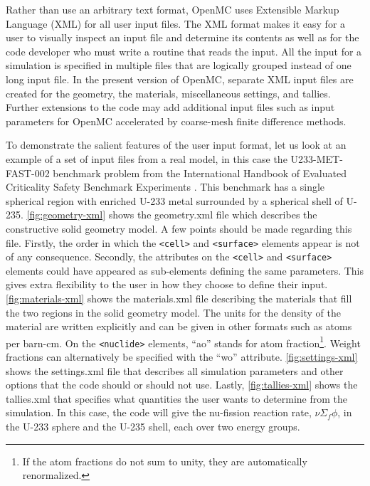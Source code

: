 \documentclass[authoryear,preprint]{elsarticle}
\begin{document}
Rather than use an arbitrary text format, OpenMC uses Extensible Markup Language
(XML) for all user input files. The XML format makes it easy for a user to
visually inspect an input file and determine its contents as well as for the
code developer who must write a routine that reads the input. All the input for
a simulation is specified in multiple files that are logically grouped instead
of one long input file. In the present version of OpenMC, separate XML input
files are created for the geometry, the materials, miscellaneous settings, and
tallies. Further extensions to the code may add additional input files such as
input parameters for OpenMC accelerated by coarse-mesh finite difference
methods.

To demonstrate the salient features of the user input format, let us look at an
example of a set of input files from a real model, in this case the
U233-MET-FAST-002 benchmark problem from the International Handbook of Evaluated
Criticality Safety Benchmark Experiments \citep{icsbep}. This benchmark has a
single spherical region with enriched U-233 metal surrounded by a spherical
shell of U-235. \autoref{fig:geometry-xml} shows the geometry.xml file which
describes the constructive solid geometry model. A few points should be made
regarding this file. Firstly, the order in which the \verb'<cell>' and
\verb'<surface>' elements appear is not of any consequence. Secondly, the
attributes on the \verb'<cell>' and \verb'<surface>' elements could have
appeared as sub-elements defining the same parameters. This gives extra
flexibility to the user in how they choose to define their
input. \autoref{fig:materials-xml} shows the materials.xml file describing the
materials that fill the two regions in the solid geometry model. The units for
the density of the material are written explicitly and can be given in other
formats such as atoms per barn-cm. On the \verb'<nuclide>' elements, ``ao''
stands for atom fraction\footnote{If the atom fractions do not sum to unity,
  they are automatically renormalized.}. Weight fractions can alternatively be
specified with the ``wo'' attribute. \autoref{fig:settings-xml} shows the
settings.xml file that describes all simulation parameters and other options
that the code should or should not use. Lastly, \autoref{fig:tallies-xml} shows
the tallies.xml that specifies what quantities the user wants to determine from
the simulation. In this case, the code will give the nu-fission reaction rate,
$\nu\Sigma_f\phi$, in the U-233 sphere and the U-235 shell, each over two energy
groups.
\end{document}
